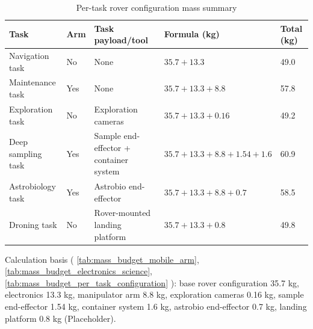 \begin{table}[!t]
\centering
\caption{Per-task rover configuration mass summary}
\label{tab:mass_budget_per_task_configuration}
\begin{tabular}{@{}L{2.9cm} C{1.4cm} L{3.2cm} L{4.2cm} R{2.0cm}@{}}
\toprule
\textbf{Task} & \textbf{Arm} & \textbf{Task payload/tool} & \textbf{Formula (kg)} & \textbf{Total (kg)} \\
\midrule
Navigation task    & No  & None & $35.7 + 13.3$ & 49.0 \\
Maintenance task   & Yes & None & $35.7 + 13.3 + 8.8$ & 57.8 \\
Exploration task   & No  & Exploration cameras & $35.7 + 13.3 + 0.16$ & 49.2 \\
Deep sampling task & Yes & Sample end-effector + container system & $35.7 + 13.3 + 8.8 + 1.54 + 1.6$ & 60.9 \\
Astrobiology task  & Yes & Astrobio end-effector & $35.7 + 13.3 + 8.8 + 0.7$ & 58.5 \\
Droning task       & No  & Rover-mounted landing platform & $35.7 + 13.3 + 0.8$ & 49.8 \\
\bottomrule
\end{tabular}
\end{table}

Calculation basis (
\autoref{tab:mass_budget_mobile_arm}, \autoref{tab:mass_budget_electronics_science}, \autoref{tab:mass_budget_per_task_configuration}
): base rover configuration 35.7 kg, electronics 13.3 kg, manipulator arm 8.8 kg, exploration cameras 0.16 kg, sample end-effector 1.54 kg, container system 1.6 kg, astrobio end-effector 0.7 kg, landing platform 0.8 kg (Placeholder).

